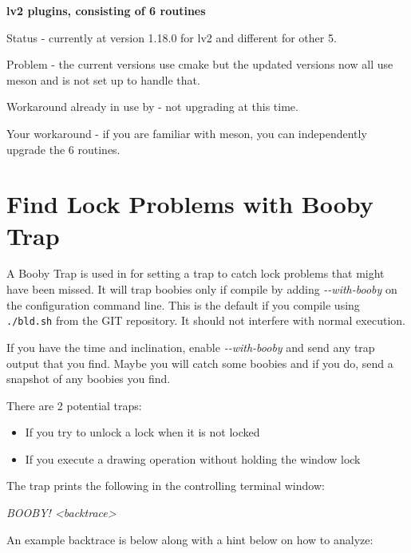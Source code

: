 \textbf{lv2 plugins, consisting of 6 routines}
\begin{description}[noitemsep]
     \item Status - currently at version 1.18.0 for lv2 and different for other 5.
     \item Problem - the current versions use cmake but the updated versions now all use meson and \CGG{} is not set up to handle that.
     \item Workaround already in use by \CGG{} - not upgrading at this time.
     \item Your workaround - if you are familiar with meson, you can independently upgrade the 6 routines.
\end{description}

\section{Find Lock Problems with Booby Trap}
\label{sec:find_lock_problems_booby_trap}

A Booby Trap is used in \CGG{} for setting a trap to catch lock problems that might have been missed. It will trap boobies only if compile by adding \textit{-{}-with-booby} on the configuration command line. This is the default if you compile using \texttt{./bld.sh} from the GIT repository. It should not interfere with normal execution.

If you have the time and inclination, enable \textit{-{}-with-booby} and send any trap output that you find. Maybe you will catch some boobies and if you do, send a snapshot of any boobies you find.

There are 2 potential traps:

\begin{itemize}[nosep]
	\item If you try to unlock a lock when it is not locked
	\item If you execute a drawing operation without holding the window lock
\end{itemize}

The trap prints the following in the controlling terminal window:

\hspace{2em} \textit{BOOBY! \qquad <backtrace>}

An example backtrace is below along with a hint below on how to analyze:

